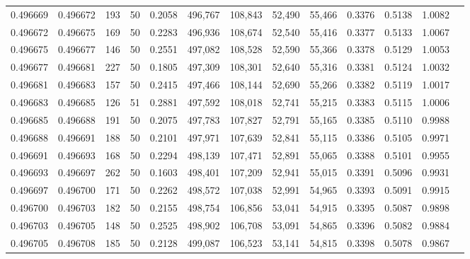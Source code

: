 \begin{tabular}{rrrrrrrrrrrrr}
0.496669 & 0.496672 &   193 &  50 &                                     0.2058 & 496,767 & 108,843 &  52,490 &  55,466 & 0.3376 & 0.5138 & 1.0082 \\
0.496672 & 0.496675 &   169 &  50 &                                     0.2283 & 496,936 & 108,674 &  52,540 &  55,416 & 0.3377 & 0.5133 & 1.0067 \\
0.496675 & 0.496677 &   146 &  50 &                                     0.2551 & 497,082 & 108,528 &  52,590 &  55,366 & 0.3378 & 0.5129 & 1.0053 \\
0.496677 & 0.496681 &   227 &  50 &                                     0.1805 & 497,309 & 108,301 &  52,640 &  55,316 & 0.3381 & 0.5124 & 1.0032 \\
0.496681 & 0.496683 &   157 &  50 &                                     0.2415 & 497,466 & 108,144 &  52,690 &  55,266 & 0.3382 & 0.5119 & 1.0017 \\
0.496683 & 0.496685 &   126 &  51 &                                     0.2881 & 497,592 & 108,018 &  52,741 &  55,215 & 0.3383 & 0.5115 & 1.0006 \\
0.496685 & 0.496688 &   191 &  50 &                                     0.2075 & 497,783 & 107,827 &  52,791 &  55,165 & 0.3385 & 0.5110 & 0.9988 \\
0.496688 & 0.496691 &   188 &  50 &                                     0.2101 & 497,971 & 107,639 &  52,841 &  55,115 & 0.3386 & 0.5105 & 0.9971 \\
0.496691 & 0.496693 &   168 &  50 &                                     0.2294 & 498,139 & 107,471 &  52,891 &  55,065 & 0.3388 & 0.5101 & 0.9955 \\
0.496693 & 0.496697 &   262 &  50 &                                     0.1603 & 498,401 & 107,209 &  52,941 &  55,015 & 0.3391 & 0.5096 & 0.9931 \\
0.496697 & 0.496700 &   171 &  50 &                                     0.2262 & 498,572 & 107,038 &  52,991 &  54,965 & 0.3393 & 0.5091 & 0.9915 \\
0.496700 & 0.496703 &   182 &  50 &                                     0.2155 & 498,754 & 106,856 &  53,041 &  54,915 & 0.3395 & 0.5087 & 0.9898 \\
0.496703 & 0.496705 &   148 &  50 &                                     0.2525 & 498,902 & 106,708 &  53,091 &  54,865 & 0.3396 & 0.5082 & 0.9884 \\
0.496705 & 0.496708 &   185 &  50 &                                     0.2128 & 499,087 & 106,523 &  53,141 &  54,815 & 0.3398 & 0.5078 & 0.9867 \\

\end{tabular}
